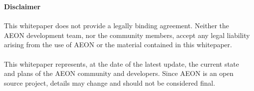 \textbf{Disclaimer}\\
\\
This whitepaper does not provide a legally binding agreement.  Neither the AEON development team, nor the community members, accept any legal liability arising from the use of AEON or the material contained in this whitepaper.\\
\\
This whitepaper represents, at the date of the latest update, the current state and plans of the AEON community and developers.  Since AEON is an open source project, details may change and should not be considered final.

\newpage

